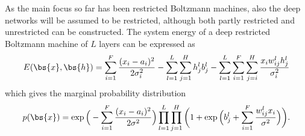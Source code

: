 As the main focus so far has been restricted Boltzmann machines, also the deep networks will be assumed to be restricted, although both partly restricted and unrestricted can be constructed. The system energy of a deep restricted Boltzmann machine of $L$ layers can be expressed as
\begin{equation}
E(\bs{x},\bs{h})= \sum_{i=1}^F\frac{(x_i-a_i)^2}{2\sigma_i^2} - \sum_{l=1}^L\sum_{j=1}^Hh_j^lb_j^l-\sum_{l=1}^L\sum_{i=1}^F\sum_{j=i}^H \frac{x_iw_{ij}^lh_j^l}{\sigma_i^2}
\label{eq:deepgaussianbinary}
\end{equation}
which gives the marginal probability distribution
\begin{equation}
p(\bs{x})=\exp\Big(-\sum_{i=1}^F\frac{(x_i-a_i)^2}{2\sigma^2}\Big)\prod_{l=1}^L\prod_{j=1}^H\bigg(1+\exp\Big(b_j^l+\sum_{i=1}^F\frac{w_{ij}^lx_i}{\sigma^2}\Big)\bigg).
\label{eq:DRBMWF}
\end{equation}